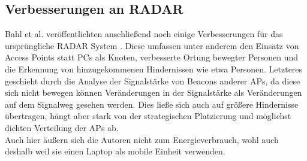 \subsection{Verbesserungen an RADAR}
Bahl et al. veröffentlichten anschließend noch einige Verbesserungen für das ursprüngliche RADAR System \cite{bahl2000enhancements}.
Diese umfassen unter anderem den Einsatz von Access Points statt PCs als Knoten, verbesserte Ortung bewegter Personen und die Erkennung von hinzugekommenen Hindernissen wie etwa Personen.
Letzteres geschieht durch die Analyse der Signalstärke von Beacons anderer APs, da diese sich nicht bewegen können Veränderungen in der Signalstärke als Veränderungen auf dem Signalweg gesehen werden.
Dies ließe sich auch auf größere Hindernisse übertragen, hängt aber stark von der strategischen Platzierung und möglichst dichten Verteilung der APs ab.\\
Auch hier äußern sich die Autoren nicht zum Energieverbrauch, wohl auch deshalb weil sie einen Laptop als mobile Einheit verwenden.

